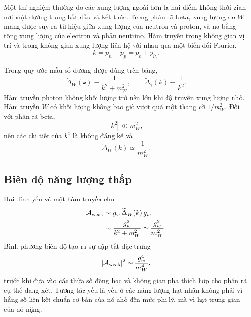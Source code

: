 Một thí nghiệm thường đo các xung lượng ngoài hơn là hai điểm không-thời gian nơi một đường trong bắt đầu và kết thúc. Trong phân rã beta, xung lượng do \(W\) mang được suy ra từ hiệu giữa xung lượng của neutron và proton, và nó bằng tổng xung lượng của electron và phản neutrino. Hàm truyền trong không gian vị trí và trong không gian xung lượng liên hệ với nhau qua một biến đổi Fourier.
\begin{equation}
  k=p_n-p_p=p_e+p_{\bar\nu_e}.
\end{equation}

Trong quy ước mẫu số dương được dùng trên bảng,
\begin{equation}
  \widetilde{\Delta}_W(k)=\frac1{k^2+m_W^2},
  \qquad
  \widetilde{\Delta}_\gamma(k)=\frac1{k^2}.
\end{equation}
Hàm truyền photon không khối lượng trở nên lớn khi độ truyền xung lượng nhỏ. Hàm truyền \(W\) có khối lượng không bao giờ vượt quá một thang cỡ \(1/m_W^2\). Đối với phân rã beta,
\begin{equation}
  |k^2|\ll m_W^2,
\end{equation}
nên các chi tiết của \(k^2\) là không đáng kể và
\begin{equation}
  \widetilde{\Delta}_W(k)\simeq\frac1{m_W^2}.
\end{equation}

\begin{classroomqa}
\end{classroomqa}

\subsection{Biên độ năng lượng thấp}

Hai đỉnh yếu và một hàm truyền cho
\begin{align}
  \mathcal A_{\rm weak}
  &\sim g_w\,\widetilde{\Delta}_W(k)\,g_w\\
  &\sim\frac{g_w^2}{k^2+m_W^2}
  \simeq\frac{g_w^2}{m_W^2}.
\end{align}
Bình phương biên độ tạo ra sự dập tắt đặc trưng
\begin{equation}
  |\mathcal A_{\rm weak}|^2
  \sim\frac{g_w^4}{m_W^4},
\end{equation}
trước khi đưa vào các thừa số động học và không gian pha thích hợp cho phân rã cụ thể đang xét. Tương tác yếu là yếu ở các năng lượng hạt nhân không phải vì hằng số liên kết chuẩn cơ bản của nó nhỏ đến mức phi lý, mà vì hạt trung gian của nó nặng.

